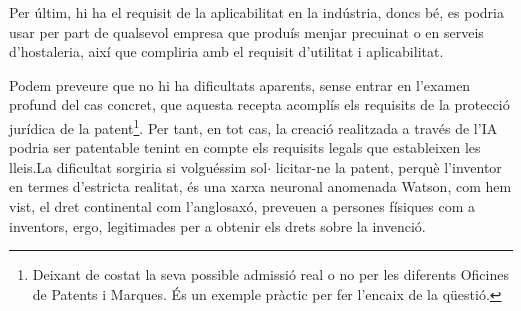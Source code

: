 \documentclass[12pt]{article}
\begin{document}
\vspace{\baselineskip}
\begin{justify}
Per últim, hi ha el requisit de la aplicabilitat en la indústria, doncs bé, es podria usar per part de qualsevol empresa que produís menjar precuinat o en serveis d’hostaleria, així que compliria amb el requisit d’utilitat i aplicabilitat.  
\end{justify}\par


\vspace{\baselineskip}
\begin{justify}
Podem preveure que no hi ha dificultats aparents, sense entrar en l’examen profund del cas concret, que aquesta recepta acomplís els requisits de la protecció jurídica de la patent\footnote{ Deixant de costat la seva possible admissió real o no per les diferents Oficines de Patents i Marques. És un exemple pràctic per fer l’encaix de la qüestió.  }. Per tant, en tot cas, la creació realitzada a través de l’IA podria ser patentable tenint en compte els requisits legals que estableixen les lleis.La dificultat sorgiria si volguéssim sol$ \cdot $ licitar-ne la patent, perquè l’inventor en termes d’estricta realitat, és una xarxa neuronal anomenada Watson, com hem vist, el dret continental com l’anglosaxó, preveuen a persones físiques com a inventors, ergo, legitimades per a obtenir els drets sobre la invenció. 
\end{justify}\par
\end{document}
